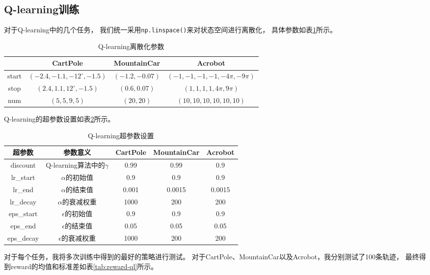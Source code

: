\documentclass[a4paper,UTF8]{article}
\theoremstyle{definition}
\begin{document}
\subsection*{Q-learning训练}

对于Q-learning中的几个任务，
我们统一采用\lstinline[language=Python]{np.linspace()}来对状态空间进行离散化，
具体参数如表\ref{tab:disc-ql}所示。

\begin{table}[H]
	\centering
	\caption{Q-learning离散化参数}\label{tab:disc-ql}
	\begin{tabular}{c|ccc}
		\toprule
		& CartPole & MountainCar & Acrobot \\
		\midrule
		start & $(-2.4, -1.1, -12^\circ, -1.5)$ & $(-1.2, -0.07)$ & $(-1, -1, -1, -1, -4\pi, -9\pi)$ \\
		stop & $(2.4, 1.1, 12^\circ, -1.5)$ & $(0.6, 0.07)$ & $(1, 1, 1, 1, 4\pi, 9\pi)$ \\
		num & $(5, 5, 9, 5)$ & $(20, 20)$ & $(10, 10, 10, 10, 10, 10)$ \\
		\bottomrule
	\end{tabular}
\end{table}

Q-learning的超参数设置如表\ref{tab:arg-ql}所示。

\begin{table}[H]
	\centering
	\caption{Q-learning超参数设置}\label{tab:arg-ql}
	\begin{tabular}{ccccc}
		\toprule
		超参数 & 参数意义 & CartPole & MountainCar & Acrobot \\
		\midrule
		discount & Q-learning算法中的$\gamma$ & 0.99 & 0.99 & 0.9 \\
		lr\_start & $\alpha$的初始值 & 0.9 & 0.9 & 0.9 \\
		lr\_end & $\alpha$的结束值 & 0.001 & 0.0015 & 0.0015 \\
		lr\_decay & $\alpha$的衰减权重 & 1000 & 200 & 200 \\
		eps\_start & $\epsilon$的初始值 & 0.9 & 0.9 & 0.9 \\
		eps\_end & $\epsilon$的结束值 & 0.05 & 0.05 & 0.05\\
		eps\_decay & $\epsilon$的衰减权重 & 1000 & 200 & 200 \\
		\bottomrule
	\end{tabular}
\end{table}

对于每个任务，我将多次训练中得到的最好的策略进行测试。
对于CartPole、MountainCar以及Acrobot，我分别测试了100条轨迹，
最终得到reward的均值和标准差如表\ref{tab:reward-ql}所示。
\end{document}
